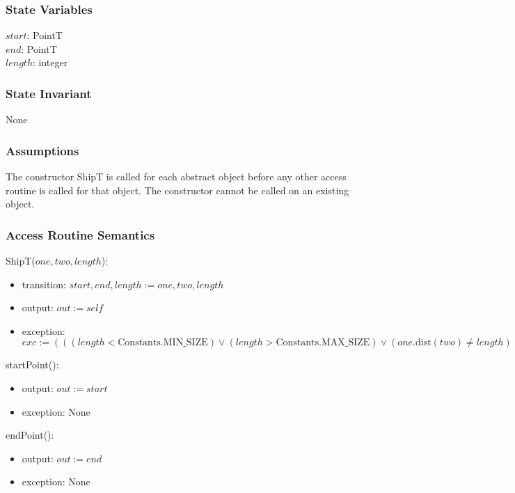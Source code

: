 \documentclass[12pt]{article}
\begin{document}
\subsubsection* {State Variables}

$start$: PointT\\
$end$: PointT\\
$length$: integer

\subsubsection* {State Invariant}

None

\subsubsection* {Assumptions}
The constructor ShipT is called for each abstract object before any other access routine is called for that
object.  The constructor cannot be called on an existing object.

\subsubsection* {Access Routine Semantics}

ShipT($one, two, length$):
\begin{itemize}
\item transition: $start, end, length := one, two, length$
\item output: $out := \mathit{self}$
\item exception:
 $exc := (((length < \mbox{Constants.MIN\_SIZE}) \lor (length > \mbox{Constants.MAX\_SIZE}) \lor (one.\mbox{dist}(two) \neq length) \lor ((one.\mbox{xcrd}() \neq two.\mbox{xcrd}()) \land (one.\mbox{ycrd}() \neq two.\mbox{ycrd}())))\Rightarrow
\mbox{InvalidShipException})$
\end{itemize}

\noindent startPoint():
\begin{itemize}
\item output: $out := start$
\item exception: None
\end{itemize}

\noindent endPoint():
\begin{itemize}
\item output: $out := end$
\item exception: None
\end{itemize}
\end{document}
